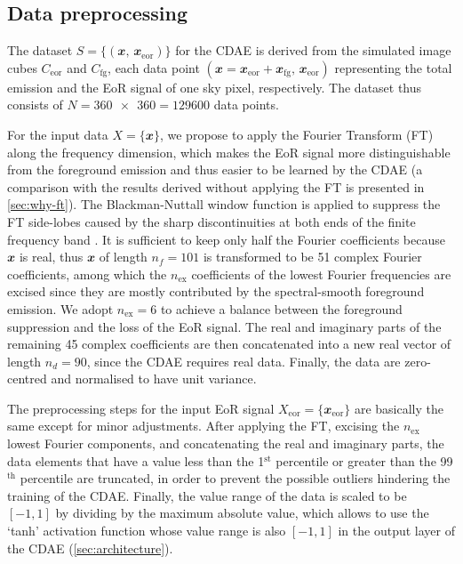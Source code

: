 \documentclass[fleqn,usenatbib]{mnras}
\newcommand{\R}[1]{\mathrm{#1}}
\newcommand{\B}[1]{\mathbfit{#1}}
\begin{document}
\subsection{Data preprocessing}
\label{sec:preprocessing}

The dataset $S = \{(\B{x}, \,\B{x}_{\R{eor}})\}$ for the CDAE is derived
from the simulated image cubes $C_{\R{eor}}$ and $C_{\R{fg}}$, each data
point $(\B{x} = \B{x}_{\R{eor}} + \B{x}_{\R{fg}}, \,\B{x}_{\R{eor}})$
representing the total emission and the EoR signal of one sky pixel,
respectively.
The dataset thus consists of $N = \num{360x360} = \num{129600}$ data points.

For the input data $X = \{\B{x}\}$, we propose to apply the
Fourier Transform (FT) along the frequency dimension,
which makes the EoR signal more distinguishable from the
foreground emission and thus easier to be learned by the CDAE
(a comparison with the results derived without applying the FT is
presented in \autoref{sec:why-ft}).
The Blackman-Nuttall window function is applied to suppress the
FT side-lobes caused by the sharp discontinuities at both ends
of the finite frequency band \citep[e.g.,][]{chapman2016}.
It is sufficient to keep only half the Fourier coefficients because
$\B{x}$ is real, thus $\B{x}$ of length $n_f = 101$ is transformed to
be 51 complex Fourier coefficients, among which the $n_{\R{ex}}$
coefficients of the lowest Fourier frequencies are excised since they
are mostly contributed by the spectral-smooth foreground emission.
We adopt $n_{\R{ex}} = 6$ to achieve a balance between the foreground
suppression and the loss of the EoR signal.
The real and imaginary parts of the remaining 45 complex coefficients
are then concatenated into a new real vector of length $n_d = 90$,
since the CDAE requires real data.
Finally, the data are zero-centred and normalised to have unit variance.

The preprocessing steps for the input EoR signal
$X_{\R{eor}} = \{\B{x}_{\R{eor}}\}$
are basically the same except for minor adjustments.
After applying the FT, excising the $n_{\R{ex}}$ lowest Fourier
components, and concatenating the real and imaginary parts,
the data elements that have a value less than the 1$^{\R{st}}$
percentile or greater than the 99$^{\R{th}}$ percentile are truncated,
in order to prevent the possible outliers hindering the training of
the CDAE.
Finally, the value range of the data is scaled to be $[-1, 1]$ by
dividing by the maximum absolute value,
which allows to use the `tanh' activation function whose value range
is also $[-1, 1]$ in the output layer of the CDAE
(\autoref{sec:architecture}).
\end{document}
